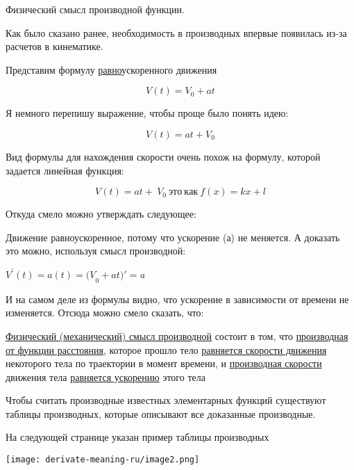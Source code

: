 \documentclass[
]{article}
\begin{document}
Физический смысл производной функции.

Как было сказано ранее, необходимость в производных впервые появилась
из-за расчетов в кинематике.

Представим формулу \uline{равно}ускоренного движения

\[V(t) = V_{0} + at\]

Я немного перепишу выражение, чтобы проще было понять идею:

\[V(t) = at + V_{0}\]

Вид формулы для нахождения скорости очень похож на формулу, которой
задается линейная функция:

\[V(t) = at + \ V_{0}\ это\ как\ f(x) = kx + l\]

Откуда смело можно утверждать следующее:

Движение равноускоренное, потому что ускорение (а) не меняется. А
доказать это можно, используя смысл производной:

\(V^{'}(t) = {a(t) = (V}_{0} + at)' =\)\emph{a}

И на самом деле из формулы видно, что ускорение в зависимости от времени
не изменяется. Отсюда можно смело сказать, что:

\uline{Физический (механический) смысл производной} состоит в том, что
\uline{производная от функции расстояния}, которое прошло тело
\uline{равняется скорости движения} некоторого тела по траектории в
момент времени, и \uline{производная скорости} движения тела
\uline{равняется ускорению} этого тела

Чтобы считать производные известных элементарных функций существуют
таблицы производных, которые описывают все доказанные производные.

На следующей странице указан пример таблицы производных

\texttt{[image: derivate-meaning-ru/image2.png]}
\end{document}
